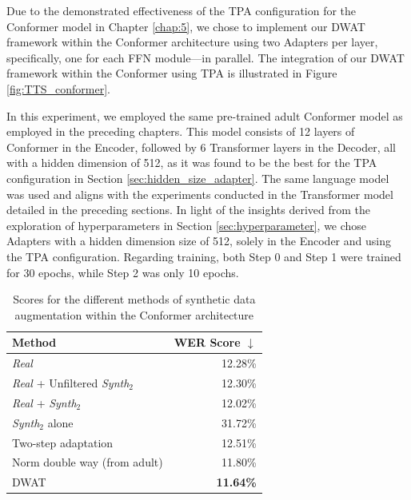 Due to the demonstrated effectiveness of the \ac{TPA} configuration for the Conformer model in Chapter \ref{chap:5}, we chose to implement our \ac{DWAT} framework within the Conformer architecture using two Adapters per layer, specifically, one for each \ac{FFN} module—in parallel. The integration of our \ac{DWAT} framework within the Conformer using \ac{TPA} is illustrated in Figure \ref{fig:TTS_conformer}.

In this experiment, we employed the same pre-trained adult Conformer model as employed in the preceding chapters. This model consists of 12 layers of Conformer in the Encoder, followed by 6 Transformer layers in the Decoder, all with a hidden dimension of 512, as it was found to be the best for the \ac{TPA} configuration in Section \ref{sec:hidden_size_adapter}. The same language model was used and aligns with the experiments conducted in the Transformer model detailed in the preceding sections. In light of the insights derived from the exploration of hyperparameters in Section \ref{sec:hyperparameter}, we chose Adapters with a hidden dimension size of 512, solely in the Encoder and using the \ac{TPA} configuration. Regarding training, both Step 0 and Step 1 were trained for 30 epochs, while Step 2 was only 10 epochs.

\begin{table}[h]
    \centering
    \begin{tabular}{lr}
        \toprule
        Method & WER Score $\downarrow$ \\
        \midrule
        \textit{Real} & 12.28\% \\ \hline
        \textit{Real} + Unfiltered \textit{Synth$_2$}  & 12.30\% \\ 
        \textit{Real} + \textit{Synth$_2$} & 12.02\% \\
        \textit{Synth$_2$} alone & 31.72\% \\ 
        Two-step adaptation & 12.51\% \\ \hline
        Norm double way (from adult) & 11.80\% \\
        DWAT & \textbf{11.64\%} \\
        \bottomrule
    \end{tabular}
    \caption{Scores for the different methods of synthetic data augmentation within the Conformer architecture}
    \label{tab:DWAT_conformer}
\end{table}

